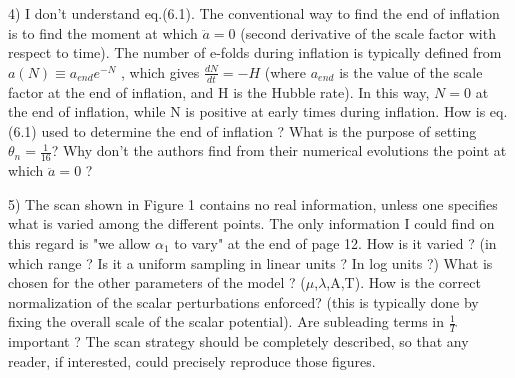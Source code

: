 \documentclass[a4paper,11pt]{article}
\begin{document}
{

4) I don't understand eq.(6.1). The conventional way to find the end
of inflation is to find the moment at which $\ddot a = 0$ (second derivative of the
scale factor with respect to time). The number of e-folds during inflation is
typically defined from $a(N ) \equiv a_{end} e^{-N}$ , which gives  $\frac{dN}{dt} = -H$ (where $a_{end}$ 
is the value of the scale factor at the end of inflation, and H is the Hubble
rate). In this way, $N = 0$ at the end of inflation, while N is positive at
early times during inflation. How is eq. (6.1) used to determine the end of
inflation ?  What is the purpose of setting $\theta_n = \frac{1}{16}$?  Why don't the authors 
find from their numerical evolutions the point at which $\ddot a = 0$ ?\\



5) The scan shown in Figure 1 contains no real information, unless one
specifies what is varied among the different points. The only information I
could find on this regard is "we allow $\alpha_1$ to vary" at the end of page 12.
How is it varied ? (in which range ? Is it a uniform sampling in linear units
? In log units ?) What is chosen for the other parameters of the model
? ($\mu$,$\lambda$,A,T). How is the correct normalization of the scalar perturbations
enforced? (this is typically done by fixing the overall scale of the scalar
potential). Are subleading terms in $\frac{1}{T}$  important ? The scan strategy should
be completely described, so that any reader, if interested, could precisely reproduce those figures.\\

}
\end{document}
